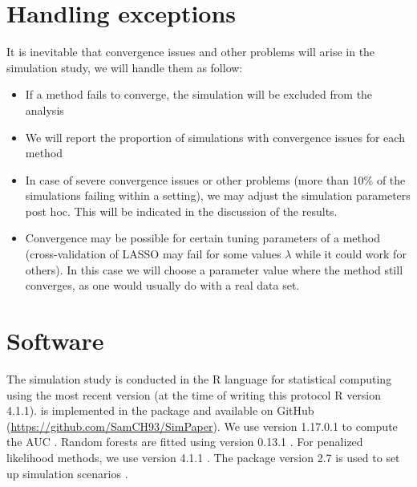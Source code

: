 \documentclass[a4paper, 11pt]{article}\usepackage[]{graphicx}\usepackage[]{color}
\begin{document}
\section{Handling exceptions} \label{sec:exceptions}
It is inevitable that convergence issues and other problems will arise
in the simulation study, we will handle them as follow:
\begin{itemize}
  \item If a method fails to converge, the simulation will be excluded from the
  analysis
  \item We will report the proportion of simulations with convergence issues
  for each method
  \item In case of severe convergence issues or other problems (more than 10\% of the
  simulations failing within a setting), we may adjust
  the simulation parameters post hoc. This will be indicated in the discussion of
  the results.
  \item Convergence may be possible for certain tuning parameters of a method
  (\eg cross-validation of LASSO may fail for some values $\lambda$ while it could
  work for others). In this case we will choose a parameter value where the method
  still converges, as one would usually do with a real data set.

\end{itemize}


\section{Software} \label{sec:software}

The simulation study is conducted in the \textsf{R} language for statistical
computing \citep{pkg:base} using the most recent version (at the time of writing
this protocol %
R version 4.1.1).
\ainet{} is implemented in the  package and available on GitHub 
(\url{https://github.com/SamCH93/SimPaper}).
We use  version 1.17.0.1 to compute the AUC \citep{pkg:proc}.
Random forests are fitted using  version 0.13.1 \citep{ranger2017}.
For penalized likelihood methods, we use  version 4.1.1
\citep{Friedman2010,Simon2011}.
The  package version 2.7 is used to set up simulation scenarios
\citep{Chalmers2020}.
\end{document}
